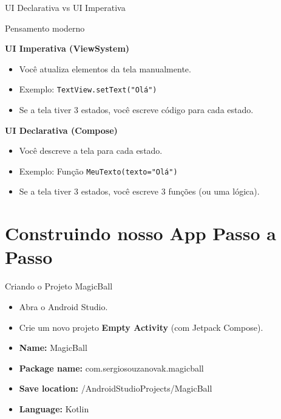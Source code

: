 \documentclass[aspectratio=169]{beamer}
\begin{document}
\begin{frame}{UI Declarativa vs UI Imperativa}
  \begin{exampleblock}{Pensamento moderno}
    \begin{minipage}{0.48\textwidth}
      \textbf{UI Imperativa (ViewSystem)}
      \begin{itemize}
        \item Você atualiza elementos da tela manualmente.
        \item Exemplo: \texttt{TextView.setText("Olá")}
        \item Se a tela tiver 3 estados, você escreve código para cada estado.
      \end{itemize}
    \end{minipage}
    \hfill
    \begin{minipage}{0.48\textwidth}
      \textbf{UI Declarativa (Compose)}
      \begin{itemize}
        \item Você descreve a tela para cada estado.
        \item Exemplo: Função \texttt{MeuTexto(texto="Olá")}
        \item Se a tela tiver 3 estados, você escreve 3 funções (ou uma lógica).
      \end{itemize}
    \end{minipage}
  \end{exampleblock}
\end{frame}

\section{Construindo nosso App Passo a Passo}

\begin{frame}[fragile]{Criando o Projeto MagicBall}
  \begin{itemize}
    \item Abra o Android Studio.
    \item Crie um novo projeto \textbf{Empty Activity} (com Jetpack Compose).
    \item \textbf{Name:} MagicBall
    \item \textbf{Package name:} com.sergiosouzanovak.magicball
    \item \textbf{Save location:} /AndroidStudioProjects/MagicBall
    \item \textbf{Language:} Kotlin
  \end{itemize}
\end{frame}
\end{document}
